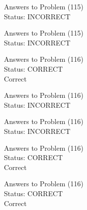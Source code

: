 \documentclass[11pt]{article}
\begin{document}
\begin{minipage}[t]{0.5\textwidth}
  {\centering
  
  Answers to Problem (115)\\
  Status: INCORRECT\\
  
  }
\end{minipage}
\begin{minipage}[t]{0.5\textwidth}
  {\centering
  
  Answers to Problem (115)\\
  Status: INCORRECT\\
  
  }
\end{minipage}
\begin{minipage}[t]{0.5\textwidth}
  {\centering
  
  Answers to Problem (116)\\
  Status: CORRECT\\
  Correct\\
  }
\end{minipage}
\begin{minipage}[t]{0.5\textwidth}
  {\centering
  
  Answers to Problem (116)\\
  Status: INCORRECT\\
  
  }
\end{minipage}
\begin{minipage}[t]{0.5\textwidth}
  {\centering
  
  Answers to Problem (116)\\
  Status: INCORRECT\\
  
  }
\end{minipage}
\begin{minipage}[t]{0.5\textwidth}
  {\centering
  
  Answers to Problem (116)\\
  Status: CORRECT\\
  Correct\\
  }
\end{minipage}
\begin{minipage}[t]{0.5\textwidth}
  {\centering
  
  Answers to Problem (116)\\
  Status: CORRECT\\
  Correct\\
  }
\end{minipage}
\end{document}

